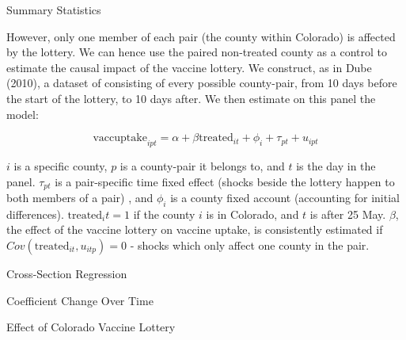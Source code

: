 \documentclass[12pt]{article}
\begin{document}
\begin{spacing}{1.5}
		\begin{table}
			\centering
			\caption{Summary Statistics}
			\centerline{}
			\label{table:didsummary}
		\end{table}
		
		However, only one member of each pair (the county within Colorado) is affected by the lottery. We can hence use the paired non-treated county as a control to estimate the causal impact of the vaccine lottery. We construct, as in Dube (2010), a dataset of consisting of every possible county-pair, from 10 days before the start of the lottery, to 10 days after. We then estimate on this panel the model:
		
		\begin{equation} \label{eq:pairdesign}
			\textrm{vaccuptake}_{ipt} = \alpha + \beta \textrm{treated}_{it} + \phi_i + \tau_{pt} + u_{ipt}
		\end{equation}
		
		$i$ is a specific county, $p$ is a county-pair it belongs to, and $t$ is the day in the panel. $\tau_{pt}$ is a pair-specific time fixed effect (shocks beside the lottery happen to both members of a pair) , and $\phi_i$ is a county fixed account (accounting for initial differences). $\textrm{treated}_it=1$ if the county $i$ is in Colorado, and $t$ is after 25 May. $\beta$, the effect of the vaccine lottery on vaccine uptake, is consistently estimated if $Cov(\textrm{treated}_{it}, u_{itp})=0$ - shocks which only affect one county in the pair.
		
		
		\begin{table}
			\centering
			\caption{Cross-Section Regression}
			\centerline{}
			\label{table:crosssection}
		\end{table}
		
		\begin{table}
			\centering
			\caption{Coefficient Change Over Time}
			\centerline{}
			\label{table:trends}
		\end{table}
	
		\begin{table}
			\centering
			\caption{Effect of Colorado Vaccine Lottery}
			\centerline{}
			\label{table:didresults}
		\end{table}
	\end{spacing}
\end{document}
